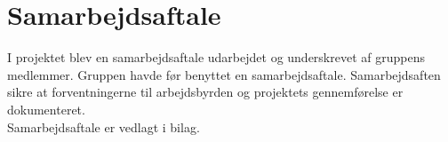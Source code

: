 \section{Samarbejdsaftale}
I projektet blev en samarbejdsaftale udarbejdet og underskrevet af gruppens medlemmer. 
Gruppen havde før benyttet en samarbejdsaftale. Samarbejdsaften sikre at forventningerne til arbejdsbyrden og projektets gennemførelse er dokumenteret. \\
Samarbejdsaftale er vedlagt i bilag. \\
